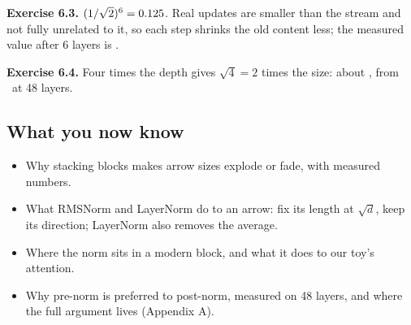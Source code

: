 \textbf{Exercise 6.3.} $(1/\sqrt2)^6=0.125$. Real updates are smaller than the stream and not fully
unrelated to it, so each step shrinks the old content less; the measured value after 6 layers is \nSixCosPostSix.

\textbf{Exercise 6.4.} Four times the depth gives $\sqrt4=2$ times the size: about \nSixPreRmsPredict, from
\nSixRmsPreFortyEight\ at 48 layers.
\normalsize

\subsection*{What you now know}
\begin{itemize}
\item Why stacking blocks makes arrow sizes explode or fade, with measured numbers.
\item What RMSNorm and LayerNorm do to an arrow: fix its length at $\sqrt d$, keep its direction; LayerNorm also
removes the average.
\item Where the norm sits in a modern block, and what it does to our toy's attention.
\item Why pre-norm is preferred to post-norm, measured on 48 layers, and where the full argument lives (Appendix A).
\end{itemize}
